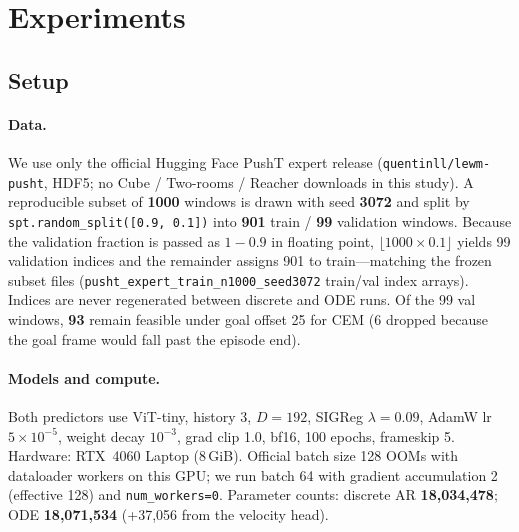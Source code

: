 \section{Experiments}
\label{sec:exp}

\subsection{Setup}
\label{sec:setup}

\paragraph{Data.}
We use only the official Hugging Face PushT expert release
(\texttt{quentinll/lewm-pusht}, HDF5; no Cube / Two-rooms / Reacher
downloads in this study).
A reproducible subset of \textbf{1000} windows is drawn with seed
\textbf{3072} and split by \texttt{spt.random\_split([0.9, 0.1])} into
\textbf{901} train / \textbf{99} validation windows.
Because the validation fraction is passed as $1-0.9$ in floating
point, $\lfloor 1000\times 0.1\rfloor$ yields 99 validation indices and
the remainder assigns 901 to train---matching the frozen subset files
(\texttt{pusht\_expert\_train\_n1000\_seed3072} train/val index arrays).
Indices are never regenerated between discrete and ODE runs.
Of the 99 val windows, \textbf{93} remain feasible under
goal offset 25 for CEM (6 dropped because the goal frame would fall
past the episode end).

\paragraph{Models and compute.}
Both predictors use ViT-tiny, history 3, $D{=}192$, SIGReg
$\lambda{=}0.09$, AdamW lr $5{\times}10^{-5}$, weight decay
$10^{-3}$, grad clip 1.0, bf16, 100 epochs, frameskip 5.
Hardware: RTX~4060 Laptop (8\,GiB).
Official batch size 128 OOMs with dataloader workers on this GPU; we
run batch 64 with gradient accumulation 2 (effective 128) and
\texttt{num\_workers=0}.
Parameter counts: discrete AR \textbf{18,034,478}; ODE
\textbf{18,071,534} (+37{,}056 from the velocity head).

